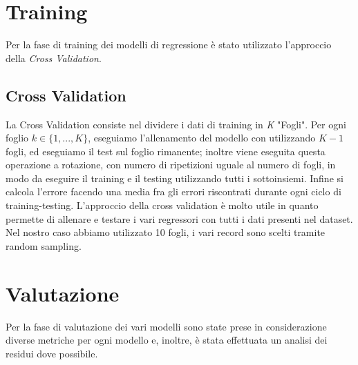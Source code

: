 \documentclass[12pt, a4paper, twocolumn]{article} %
\begin{document}
\section{Training}
Per la fase di training dei modelli di regressione è stato utilizzato l'approccio della \textit{Cross Validation}.
\subsection{Cross Validation}
La Cross Validation consiste nel dividere i dati di training in \textit{K} "Fogli". Per ogni foglio $k \in \lbrace1,..., K\rbrace$, eseguiamo l'allenamento del modello con utilizzando $K-1$ fogli, ed eseguiamo il test sul foglio rimanente; inoltre viene eseguita questa operazione a rotazione, con numero di ripetizioni uguale al numero di fogli, in modo da eseguire il training e il testing utilizzando tutti i sottoinsiemi. Infine si calcola l'errore facendo una media fra gli errori riscontrati durante ogni ciclo di training-testing. %
L'approccio della cross validation è molto utile in quanto permette di allenare e testare i vari regressori con tutti i dati presenti nel dataset.
Nel nostro caso abbiamo utilizzato 10 fogli, i vari record sono scelti tramite random sampling.

\section{Valutazione}
Per la fase di valutazione dei vari modelli sono state prese in considerazione diverse metriche per ogni modello e, inoltre, è stata effettuata un analisi dei residui dove possibile.
\end{document}
